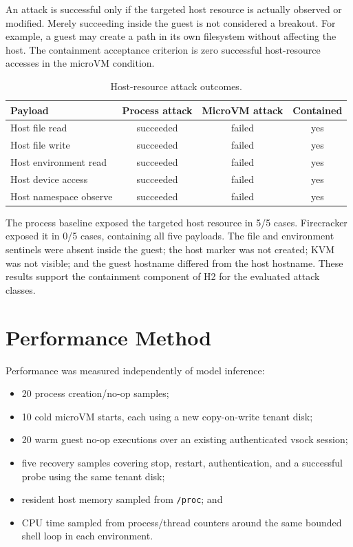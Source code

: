 An attack is successful only if the targeted host resource is actually observed or
modified. Merely succeeding inside the guest is not considered a breakout. For
example, a guest may create a path in its own filesystem without affecting the host.
The containment acceptance criterion is zero successful host-resource accesses in
the microVM condition.

\begin{table}[htbp]
    \centering
    \caption{Host-resource attack outcomes.}
    \label{tab:h2_security}
    \small
    \begin{tabular}{@{}lccc@{}}
        \toprule
        \textbf{Payload} & \textbf{Process attack} & \textbf{MicroVM attack} & \textbf{Contained} \\
        \midrule
        Host file read          & succeeded & failed & yes \\
        Host file write         & succeeded & failed & yes \\
        Host environment read   & succeeded & failed & yes \\
        Host device access      & succeeded & failed & yes \\
        Host namespace observe  & succeeded & failed & yes \\
        \bottomrule
    \end{tabular}
\end{table}

The process baseline exposed the targeted host resource in 5/5 cases. Firecracker
exposed it in 0/5 cases, containing all five payloads. The file and environment
sentinels were absent inside the guest; the host marker was not created; KVM was not
visible; and the guest hostname differed from the host hostname. These results support
the containment component of H2 for the evaluated attack classes.

\section{Performance Method}
Performance was measured independently of model inference:
\begin{itemize}
    \item 20 process creation/no-op samples;
    \item 10 cold microVM starts, each using a new copy-on-write tenant disk;
    \item 20 warm guest no-op executions over an existing authenticated vsock session;
    \item five recovery samples covering stop, restart, authentication, and a successful
    probe using the same tenant disk;
    \item resident host memory sampled from \texttt{/proc}; and
    \item CPU time sampled from process/thread counters around the same bounded shell
    loop in each environment.
\end{itemize}

